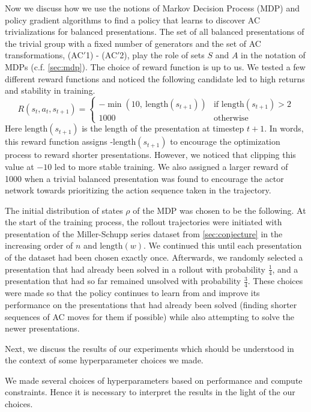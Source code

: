 Now we discuss how we use the notions of Markov Decision Process (MDP) and policy gradient algorithms to find a policy that learns to discover AC trivializations for balanced presentations. The set of all balanced presentations of the trivial group with a fixed number of generators and the set of AC transformations, (AC$'$1) - (AC$'$2), play the role of sets $S$ and $A$ in the notation of MDPs (c.f. \autoref{sec:mdp}). The choice of reward function is up to us. We tested a few different reward functions and noticed the following candidate led to high returns and stability in training.
\[
R(s_{t}, a_{t}, s_{t+1}) = 
\begin{cases} 
-\min(10, \ \text{length}(s_{t+1})) & \text{if length}(s_{t+1}) > 2 \\
1000 & \text{otherwise } 
\end{cases}
\]
Here $\text{length}(s_{t+1})$ is the length of the presentation at timestep $t+1$. In words, this reward function assigns -$\text{length}(s_{t+1})$ to encourage the optimization process to reward shorter presentations. However, we noticed that clipping this value at $-10$ led to more stable training. We also assigned a larger reward of 1000 when a trivial balanced presentation was found to encourage the actor network towards prioritizing the action sequence taken in the trajectory. 
\newline

The initial distribution of states $\rho$ of the MDP was chosen to be the following. At the start of the training process, the rollout trajectories were initiated with presentation of the Miller-Schupp series dataset from \autoref{sec:conjecture} in the increasing order of $n$ and $\text{length}(w)$. We continued this until each presentation of the dataset had been chosen exactly once. Afterwards, we randomly selected a presentation that had already been solved in a rollout with probability $\frac{1}{4}$, and a presentation that had so far remained unsolved with probability $\frac{3}{4}$. These choices were made so that the policy continues to learn from and improve its performance on the presentations that had already been solved (finding shorter sequences of AC moves for them if possible) while also attempting to solve the newer presentations. 
\newline

Next, we discuss the results of our experiments which should be understood in the context of some hyperparameter choices we made. 

We made several choices of hyperparameters based on performance and compute constraints. Hence it is necessary to interpret the results in the light of the our choices.

